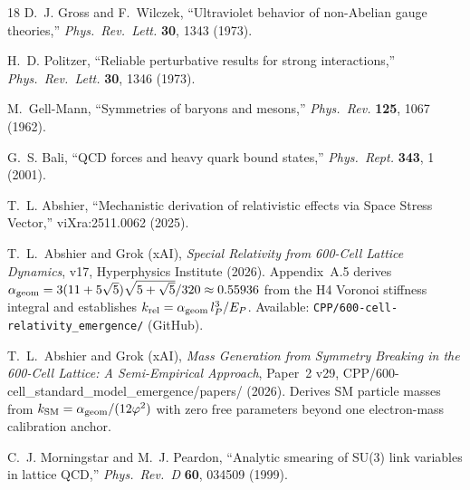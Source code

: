 \documentclass[11pt,a4paper]{article}
\newcommand{\phig}{\varphi}
\begin{document}
\begin{thebibliography}{18}
D.~J. Gross and F.~Wilczek,
``Ultraviolet behavior of non-Abelian gauge theories,''
\textit{Phys.\ Rev.\ Lett.} \textbf{30}, 1343 (1973).

H.~D. Politzer,
``Reliable perturbative results for strong interactions,''
\textit{Phys.\ Rev.\ Lett.} \textbf{30}, 1346 (1973).

M.~Gell-Mann,
``Symmetries of baryons and mesons,''
\textit{Phys.\ Rev.} \textbf{125}, 1067 (1962).

G.~S. Bali,
``QCD forces and heavy quark bound states,''
\textit{Phys.\ Rept.} \textbf{343}, 1 (2001).

T.~L. Abshier,
``Mechanistic derivation of relativistic effects via Space Stress
Vector,''
viXra:2511.0062 (2025).

T.~L.~Abshier and Grok (xAI),
\textit{Special Relativity from 600-Cell Lattice Dynamics}, v17,
Hyperphysics Institute (2026).  Appendix~A.5 derives
$\alpha_{\rm geom} = 3(11+5\sqrt{5})\sqrt{5+\sqrt{5}}/320
\approx 0.55936$ from the H4 Voronoi stiffness integral and
establishes $k_{\rm rel} = \alpha_{\rm geom}\,l_P^3/E_P$.
Available: \texttt{CPP/600-cell-relativity\_emergence/} (GitHub).

T.~L.~Abshier and Grok (xAI),
\textit{Mass Generation from Symmetry Breaking in the 600-Cell Lattice:
A Semi-Empirical Approach}, Paper~2 v29,
CPP/600-cell\_standard\_model\_emergence/papers/ (2026).
Derives SM particle masses from $k_{\rm SM} = \alpha_{\rm geom}/(12\phig^2)$
with zero free parameters beyond one electron-mass calibration anchor.

C.~J. Morningstar and M.~J. Peardon,
``Analytic smearing of SU(3) link variables in lattice QCD,''
\textit{Phys.\ Rev.\ D} \textbf{60}, 034509 (1999).

\end{thebibliography}
\end{document}
